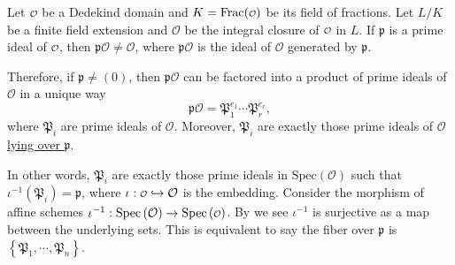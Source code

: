 \begin{proposition}{}{}
    Let $\mathcalo$ be a Dedekind domain and $K=\mathrm{Frac}(\mathcalo)$ be its field of fractions. Let $L/K$ be a finite field extension and $\mathcal{O}$ be the integral closure of $\mathcalo$ in $L$. If $\mathfrak{p}$ is a prime ideal of $\mathcalo$, then $\mathfrak{p}\mathcal{O}\ne \mathcal{O}$, where $\mathfrak{p}\mathcal{O}$ is the ideal of $\mathcal{O}$ generated by $\mathfrak{p}$.
    
    Therefore, if $\mathfrak{p}\ne (0)$, then $\mathfrak{p}\mathcal{O}$ can be factored into a product of prime ideals of $\mathcal{O}$ in a unique way 
    \[
    \mathfrak{p}\mathcal{O}=\mathfrak{P}_1^{e_1}\cdots\mathfrak{P}_r^{e_r},
    \]
    where $\mathfrak{P}_i$ are prime ideals of $\mathcal{O}$. Moreover, $\mathfrak{P}_i$ are exactly those prime ideals of $\mathcal{O}$ \hyperref[th:lying_over_and_going_up_properties]{lying over $\mathfrak{p}$}. 
\end{proposition}
\begin{remark}
    In other words, $\mathfrak{P}_i$ are exactly those prime ideals in $\mathrm{Spec}\left(\mathcal{O}\right)$ such that $\iota^{-1}\left(\mathfrak{P}_i\right)=\mathfrak{p}$, where $\iota:\mathcalo\hookrightarrow \mathcal{O}$ is the embedding. Consider the morphism of affine schemes $\iota^{-1}:\mathrm{Spec}\left(\mathcal{O}\right)\to \mathrm{Spec}\left(\mathcalo\right)$. By  we see $\iota^{-1}$ is surjective as a map between the underlying sets. This is equivalent to say the fiber over $\mathfrak{p}$ is $\left\{\mathfrak{P}_1,\cdots, \mathfrak{P}_n\right\}$.
\end{remark}
